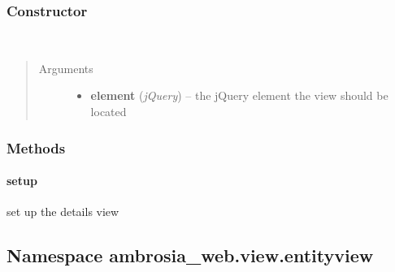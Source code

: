 \documentclass[letterpaper,10pt,english]{sphinxmanual}
\begin{document}
\subsubsection{Constructor}
\label{ambrosia_web.view.detailsview.DetailsView:constructor}

\begin{fulllineitems}
\label{ambrosia_web.view.detailsview.DetailsView:ambrosia_web.view.detailsview.DetailsView}~\begin{quote}\begin{description}
\item[{Arguments}] \leavevmode\begin{itemize}
\item {} 
\textbf{element} (\emph{jQuery}) -- the jQuery element the view should be located

\end{itemize}

\end{description}\end{quote}

\end{fulllineitems}



\subsubsection{Methods}
\label{ambrosia_web.view.detailsview.DetailsView:methods}

\paragraph{setup}
\label{ambrosia_web.view.detailsview.DetailsView:setup}

\begin{fulllineitems}
\label{ambrosia_web.view.detailsview.DetailsView:ambrosia_web.view.detailsview.DetailsView.setup}
\end{fulllineitems}


set up the details view


\subsection{Namespace ambrosia\_web.view.entityview}
\label{ambrosia_web.view.entityview:namespace-ambrosia-web-view-entityview}\label{ambrosia_web.view.entityview::doc}
\end{document}
